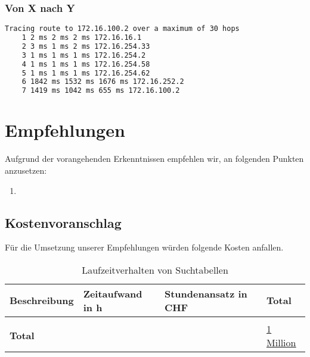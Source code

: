
\subsubsection{Von X nach Y}
\begin{lstlisting}[language=bash]
Tracing route to 172.16.100.2 over a maximum of 30 hops
	1 2 ms 2 ms 2 ms 172.16.16.1
	2 3 ms 1 ms 2 ms 172.16.254.33
	3 1 ms 1 ms 1 ms 172.16.254.2
	4 1 ms 1 ms 1 ms 172.16.254.58
	5 1 ms 1 ms 1 ms 172.16.254.62
	6 1842 ms 1532 ms 1676 ms 172.16.252.2
	7 1419 ms 1042 ms 655 ms 172.16.100.2
\end{lstlisting}





\section{Empfehlungen}
Aufgrund der vorangehenden Erkenntnissen empfehlen wir, an folgenden Punkten anzusetzen:
\begin{enumerate}
	\item 
\end{enumerate}

\subsection{Kostenvoranschlag}
Für die Umsetzung unserer Empfehlungen würden folgende Kosten anfallen.
\begin{table}[h]
	\centering
	\begin{tabu} to \linewidth {l l l l}
		\toprule 
		Beschreibung & Zeitaufwand in h  & Stundenansatz in CHF & Total \\
		\midrule
		&&& \\
		\textbf{Total} & & & \underline{\underline{1 Million}} \\
		\bottomrule 
	\end{tabu} 
	\caption{Laufzeitverhalten von Suchtabellen}
\end{table}



